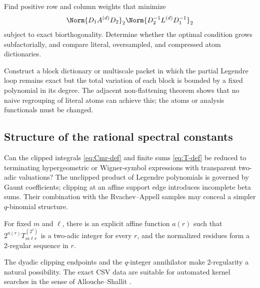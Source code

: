 \documentclass[11pt,oneside]{article}
\numberwithin{equation}{section}
\theoremstyle{definition}
\theoremstyle{remark}
\begin{document}
\begin{problem}
\label{prob:diagonal-scaling}
Find positive row and column weights that minimize
\[
 \Norm{D_1A^{(d)}D_2}_2
 \Norm{D_2^{-1}L^{(d)}D_1^{-1}}_2
\]
subject to exact biorthogonality.  Determine whether the optimal condition
grows subfactorially, and compare literal, oversampled, and compressed atom
dictionaries.
\end{problem}

\begin{problem}
\label{prob:stable-loop}
Construct a block dictionary or multiscale packet in which the partial
Legendre loop remains exact but the total variation of each block is bounded
by a fixed polynomial in its degree.  The adjacent non-flattening theorem
shows that no naive regrouping of literal atoms can achieve this; the atoms or
analysis functionals must be changed.
\end{problem}

\subsection{Structure of the rational spectral constants}

\begin{question}
\label{question:T-closed-form}
Can the clipped integrals \eqref{eq:Cmr-def} and finite sums
\eqref{eq:T-def} be reduced to terminating hypergeometric or Wigner-symbol
expressions with transparent two-adic valuations?  The unclipped product of
Legendre polynomials is governed by Gaunt coefficients; clipping at an affine
support edge introduces incomplete beta sums.  Their combination with the
Rvachev--Appell samples may conceal a simpler $q$-binomial structure.
\end{question}

\begin{conjecture}
\label{conj:T-v2}
For fixed $m$ and $\ell$, there is an explicit affine function $a(r)$ such
that $2^{a(r)}T_{m\ell r}^{(2^\ell)}$ is a two-adic integer for every $r$, and
the normalized residues form a 2-regular sequence in $r$.
\end{conjecture}

The dyadic clipping endpoints and the $q$-integer annihilator make 2-regularity
a natural possibility.  The exact CSV data are suitable for automated kernel
searches in the sense of Allouche--Shallit \cite{AlloucheShallit2003}.
\end{document}
